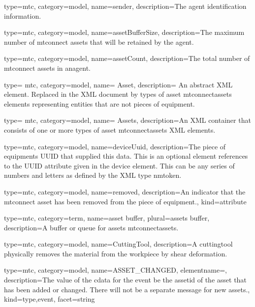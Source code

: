 {
  type=mtc,
  category=model,
  name={sender},
  description={The \gls{agent} identification information. }
}


{
  type=mtc,
  category=model,
  name={assetBufferSize},
  description={The maximum number of \glspl{mtconnect asset} that will be retained by the \gls{agent}.}
}


{
  type=mtc,
  category=model,
  name={assetCount},
  description={The total number of \glspl{mtconnect asset} in an\gls{agent}.}
}


{
  type= mtc,
  category=model,
  name= {Asset},
  description= {An abstract XML element. Replaced in the XML document by types of \gls{asset mtconnectassets} elements representing entities that are not pieces of equipment.}
}

{
  type= mtc,
  category=model,
  name= {Assets},
  description={An XML container that consists of one or more types of \gls{asset mtconnectassets} XML elements. }
}


{
  type=mtc,
  category=model,
  name={deviceUuid},
  description={The piece of equipments UUID that supplied this data. This is an optional element references to the UUID attribute given in the \gls{device} element. This can be any series of numbers and letters as defined by the XML type \gls{nmtoken}.}
}


{
  type=mtc,
  category=model,
  name={removed},
  description={An indicator that the \gls{mtconnect asset} has been removed from the piece of equipment.},
  kind={attribute}
}

{
  type=mtc,
  category=term,
  name={asset buffer},
  plural={assets buffer},
  description={A buffer or queue for \gls{assets mtconnectassets}.}
}


{
  type=mtc,
  category=model,
  name={CuttingTool},
  description={A \gls{cuttingtool} physically removes the material from the workpiece by shear deformation.}
}


{
  type=mtc,
  category=model,
  name={ASSET\_CHANGED},
  elementname=,
  description={The value of the \gls{cdata} for the event \MUST be the \gls{assetid} of the asset that has been added or changed. There will not be a separate message for new assets.},
  kind={type,event},
  facet={\gls{string}}
}

